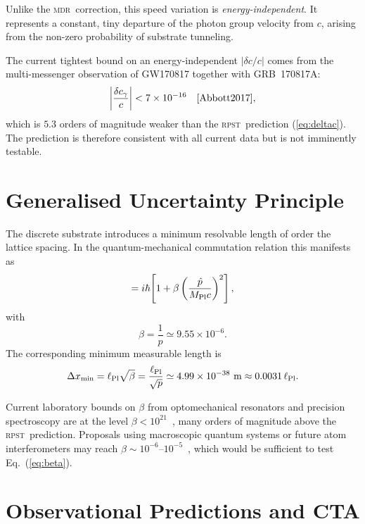 \documentclass[aps,prd,twocolumn,showpacs,preprintnumbers]{revtex4-2}
\newcommand{\rpst}{\textsc{rpst}}
\newcommand{\Mpl}{M_{\rm Pl}}
\newcommand{\lpl}{\ell_{\rm Pl}}
\newcommand{\MDR}{\textsc{mdr}}
\newcommand{\abs}[1]{\left|#1\right|}
\begin{document}
Unlike the \MDR\ correction, this speed variation is \textit{energy-independent}.
It represents a constant, tiny departure of the photon group velocity from
$c$, arising from the non-zero probability of substrate tunneling.

The current tightest bound on an energy-independent $\abs{\delta c/c}$ comes
from the multi-messenger observation of GW170817 together with GRB~170817A:
\begin{equation}
  \abs{\frac{\delta c_\gamma}{c}} < 7 \times 10^{-16}
  \quad \text{\cite{Abbott2017}},
\end{equation}
which is $5.3$ orders of magnitude weaker than the \rpst\ prediction
(\ref{eq:deltac}).  The prediction is therefore consistent with all current
data but is not imminently testable.

\section{Generalised Uncertainty Principle}
\label{sec:gup}

The discrete substrate introduces a minimum resolvable length of order the
lattice spacing.  In the quantum-mechanical commutation relation this
manifests as
\begin{equation}
  [\hat{x},\,\hat{p}\,]
    = i\hbar\!\left[1 + \beta\left(\frac{\hat{p}}{\Mpl c}\right)^2\right],
\end{equation}
with
\begin{equation}
  \beta = \frac{1}{p} \simeq 9.55 \times 10^{-6}.
\label{eq:beta}
\end{equation}
The corresponding minimum measurable length is
\begin{equation}
  \Delta x_{\min}
    = \lpl \sqrt{\beta}
    = \frac{\lpl}{\sqrt{p}}
    \simeq 4.99 \times 10^{-38}\text{ m}
    \approx 0.0031\,\lpl.
\end{equation}

Current laboratory bounds on $\beta$ from optomechanical resonators and
precision spectroscopy are at the level $\beta < 10^{21}$~\cite{Pikovski2012},
many orders of magnitude above the \rpst\ prediction.  Proposals using
macroscopic quantum systems or future atom interferometers may reach $\beta
\sim 10^{-6}$--$10^{-5}$~\cite{Bawaj2015,Bushev2019}, which would be
sufficient to test Eq.~(\ref{eq:beta}).

\section{Observational Predictions and CTA}
\label{sec:obs}
\end{document}
